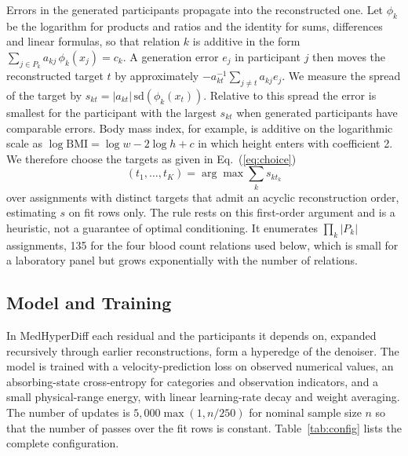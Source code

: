 \documentclass[conference]{IEEEtran}
\begin{document}
Errors in the generated participants propagate into the reconstructed one. Let $\phi_k$ be the logarithm for products and ratios and the identity for sums, differences and linear formulas, so that relation $k$ is additive in the form $\sum_{j \in P_k} a_{kj}\, \phi_k(x_j) = c_k$. A generation error $e_j$ in participant $j$ then moves the reconstructed target $t$ by approximately $-a_{kt}^{-1} \sum_{j \ne t} a_{kj} e_j$. We measure the spread of the target by $s_{kt} = |a_{kt}|\, \mathrm{sd}(\phi_k(x_t))$. Relative to this spread the error is smallest for the participant with the largest $s_{kt}$ when generated participants have comparable errors. Body mass index, for example, is additive on the logarithmic scale as $\log \mathrm{BMI} = \log w - 2\log h + c$ in which height enters with coefficient 2. We therefore choose the targets as given in Eq.~(\ref{eq:choice})
\begin{equation}
(t_1, \dots, t_K) = \arg\max \textstyle\sum_{k} s_{k t_k}
\label{eq:choice}
\end{equation}
over assignments with distinct targets that admit an acyclic reconstruction order, estimating $s$ on fit rows only. The rule rests on this first-order argument and is a heuristic, not a guarantee of optimal conditioning. It enumerates $\prod_k |P_k|$ assignments, 135 for the four blood count relations used below, which is small for a laboratory panel but grows exponentially with the number of relations.

\subsection{Model and Training}

In MedHyperDiff each residual and the participants it depends on, expanded recursively through earlier reconstructions, form a hyperedge of the denoiser. The model is trained with a velocity-prediction loss on observed numerical values, an absorbing-state cross-entropy for categories and observation indicators, and a small physical-range energy, with linear learning-rate decay and weight averaging. The number of updates is $5{,}000 \max(1, n/250)$ for nominal sample size $n$ so that the number of passes over the fit rows is constant. Table~\ref{tab:config} lists the complete configuration.
\end{document}
